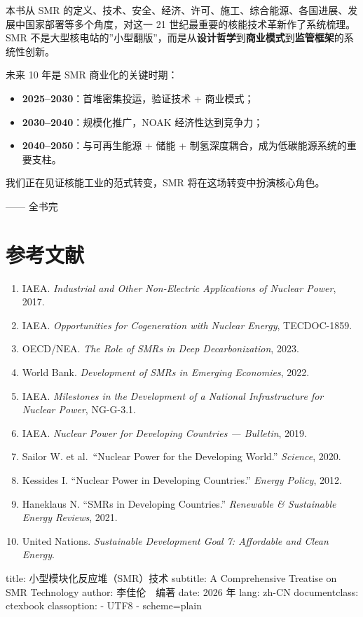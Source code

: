 \documentclass[
  UTF8,
  scheme=plain,
  fontsize=10pt,
  openany
]{ctexbook}
\begin{document}
本书从 SMR
的定义、技术、安全、经济、许可、施工、综合能源、各国进展、发展中国家部署等多个角度，对这一
21 世纪最重要的核能技术革新作了系统梳理。SMR
不是大型核电站的''小型翻版''，而是从\textbf{设计哲学}到\textbf{商业模式}到\textbf{监管框架}的系统性创新。

未来 10 年是 SMR 商业化的关键时期：

\begin{itemize}
\tightlist
\item
  \textbf{2025--2030}：首堆密集投运，验证技术 + 商业模式；
\item
  \textbf{2030--2040}：规模化推广，NOAK 经济性达到竞争力；
\item
  \textbf{2040--2050}：与可再生能源 + 储能 +
  制氢深度耦合，成为低碳能源系统的重要支柱。
\end{itemize}

我们正在见证核能工业的范式转变，SMR 将在这场转变中扮演核心角色。

------ 全书完

\section{参考文献}\label{ux53c2ux8003ux6587ux732e-17}

\begin{enumerate}
\def\labelenumi{\arabic{enumi}.}
\tightlist
\item
  IAEA. \emph{Industrial and Other Non-Electric Applications of Nuclear
  Power}, 2017.
\item
  IAEA. \emph{Opportunities for Cogeneration with Nuclear Energy},
  TECDOC-1859.
\item
  OECD/NEA. \emph{The Role of SMRs in Deep Decarbonization}, 2023.
\item
  World Bank. \emph{Development of SMRs in Emerging Economies}, 2022.
\item
  IAEA. \emph{Milestones in the Development of a National Infrastructure
  for Nuclear Power}, NG-G-3.1.
\item
  IAEA. \emph{Nuclear Power for Developing Countries --- Bulletin},
  2019.
\item
  Sailor W. et al.~``Nuclear Power for the Developing World.''
  \emph{Science}, 2020.
\item
  Kessides I. ``Nuclear Power in Developing Countries.'' \emph{Energy
  Policy}, 2012.
\item
  Haneklaus N. ``SMRs in Developing Countries.'' \emph{Renewable \&
  Sustainable Energy Reviews}, 2021.
\item
  United Nations. \emph{Sustainable Development Goal 7: Affordable and
  Clean Energy}.
\end{enumerate}

title: 小型模块化反应堆（SMR）技术 subtitle: A Comprehensive Treatise on
SMR Technology author: 李佳伦　编著 date: 2026 年 lang: zh-CN
documentclass: ctexbook classoption: - UTF8 - scheme=plain

\backmatter
\end{document}
